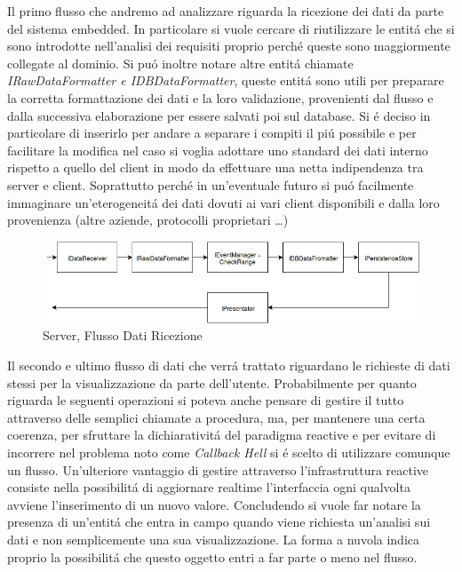 Il primo flusso che andremo ad analizzare riguarda la ricezione dei dati da parte del sistema embedded. In particolare si vuole cercare di riutilizzare le entit\'a che si sono introdotte nell'analisi dei requisiti proprio perch\'e queste sono maggiormente collegate al dominio. Si pu\'o inoltre notare altre entit\'a chiamate \textit{IRawDataFormatter e IDBDataFormatter}, queste entit\'a sono utili per preparare la corretta formattazione dei dati e la loro validazione, provenienti dal flusso e dalla successiva elaborazione per essere salvati poi sul database. Si \'e deciso in particolare di inserirlo per andare a separare i compiti il pi\'u possibile e per facilitare la modifica nel caso si voglia adottare uno standard dei dati interno rispetto a quello del client in modo da effettuare una netta indipendenza tra server e client. Soprattutto perch\'e in un'eventuale futuro si pu\'o facilmente immaginare un'eterogeneit\'a dei dati dovuti ai vari client disponibili e dalla loro provenienza (altre aziende, protocolli proprietari \ldots)

\begin{figure}[h]
\centering
\includegraphics[width=\textwidth]{Figures/LogicArchitecture/Server/FlowDiagramReceiveData}
\caption{Server, Flusso Dati Ricezione}
\end{figure}

Il secondo e ultimo flusso di dati che verr\'a trattato riguardano le richieste di dati stessi per la visualizzazione da parte dell'utente. Probabilmente per quanto riguarda le seguenti operazioni si poteva anche pensare di gestire il tutto attraverso delle semplici chiamate a procedura, ma, per mantenere una certa coerenza, per sfruttare la dichiarativit\'a del paradigma reactive e per evitare di incorrere nel problema noto come \textit{Callback Hell} si \'e scelto di utilizzare comunque un flusso. Un'ulteriore vantaggio di gestire attraverso l'infrastruttura reactive consiste nella possibilit\'a di aggiornare realtime l'interfaccia ogni qualvolta avviene l'inserimento di un nuovo valore. Concludendo si vuole far notare la presenza di un'entit\'a che entra in campo quando viene richiesta un'analisi sui dati e non semplicemente una sua visualizzazione. La forma a nuvola indica proprio la possibilit\'a che questo oggetto entri a far parte o meno nel flusso.

